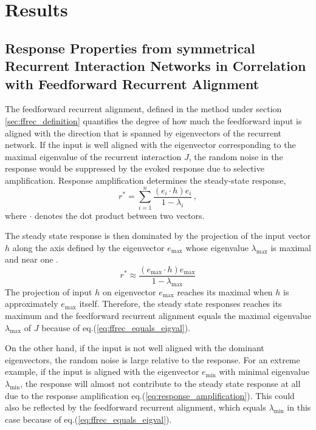 \documentclass[11pt]{article}
\begin{document}
	\section{Results}
	
	\subsection{Response Properties from symmetrical Recurrent Interaction Networks in Correlation with Feedforward Recurrent Alignment} \label{sec:results_symmetric}
	The feedforward recurrent alignment, defined in the method under section \ref{sec:ffrec_definition} quantifies the degree of how much the feedforward input is aligned with the direction that is spanned by eigenvectors of the recurrent network. If the input is well aligned with the eigenvector corresponding to the maximal eigenvalue of the recurrent interaction $J$, the random noise in the response would be suppressed by the evoked response due to selective amplification. Response amplification determines the steady-state response, 
		\begin{equation} \label{eq:response_amplification}
			r^* = \sum_{i = 1}^{n} \frac{(e_i \cdot h) e_i}{1-\lambda_i} \, ,
		\end{equation}
	where $\cdot$ denotes the dot product between two vectors. 
	
	The steady state response is then dominated by the projection of the input vector $h$ along the axis defined by the eigenvector $e_{\text{max}}$ whose eigenvalue $\lambda_{\text{max}}$ is maximal and near one \cite{dayan2005theoretical}. 
		\begin{equation} \label{eq:selective_amplification}
			r^* \approx \frac{(e_{\text{max}} \cdot h) e_{\text{max}}}{1 - \lambda_{\text{max}}}
		\end{equation}
	The projection of input $h$ on eigenvector $e_{\text{max}}$ reaches its maximal when $h$ is approximately $e_{\text{max}}$ itself. Therefore, the steady state responses reaches its maximum and the feedforward recurrent alignment equals the maximal eigenvalue $\lambda_{\text{max}}$ of $J$ because of eq.(\ref{eq:ffrec_equals_eigval}). 
	
	On the other hand, if the input is not well aligned with the dominant eigenvectors, the random noise is large relative to the response. For an extreme example, if the input is aligned with the eigenvector $e_{\text{min}}$ with minimal eigenvalue $\lambda_{\text{min}}$, the response will almost not contribute to the steady state response at all due to the response amplification eq.(\ref{eq:response_amplification}). This could also be reflected by the feedforward recurrent alignment, which equals $\lambda_{\text{min}}$ in this case because of eq.(\ref{eq:ffrec_equals_eigval}). 
	
\end{document}
